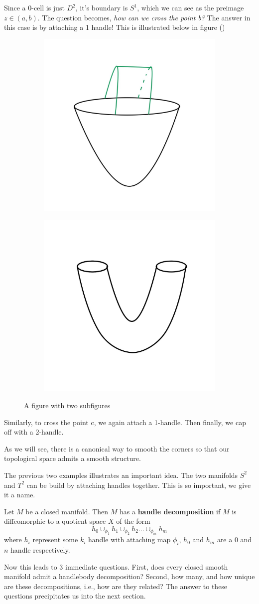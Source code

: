 \begin{example}
Since a 0-cell is just $D^{2}$, it's boundary is $S^{1}$, which we can see as the preimage $z\in (a,b)$. The question becomes, \textit{how can we cross the point b?} The answer in this case is by attaching a 1 handle! This is illustrated below in figure ()
\begin{figure}
\centering
\begin{subfigure}{.1\textwidth}
  \centering
  \includegraphics[width=.3\linewidth]{Images_Lect1/1handle.jpeg}
\end{subfigure}%
\begin{subfigure}{.1\textwidth}
  \centering
  \includegraphics[width=.3\linewidth]{Images_Lect1/1handle1.jpeg}
\end{subfigure}
\caption{A figure with two subfigures}
\label{fig:test}
\end{figure}

Similarly, to cross the point c, we again attach a 1-handle. Then finally, we cap off with a 2-handle.
\end{example}
\begin{remark}
As we will see, there is a canonical way to smooth the corners so that our topological space admits a smooth structure.
\end{remark}

The previous two examples illustrates an important idea. The two manifolds $S^{2}$ and $T^{2}$ can be build by attaching handles together. This is so important, we give it a name.
\begin{definition}
Let $M$ be a closed manifold. Then $M$ has a \textbf{handle decomposition} if $M$ is diffeomorphic to a quotient space $X$ of the form
\[
h_{0}\cup_{\phi_{1}}h_{1}\cup_{\phi_{2}}h_{2}...\cup_{\phi_{m}}h_{m}
\]
where $h_{i}$ represent some $k_{i}$ handle with attaching map $\phi_{i}$, $h_{0}$ and $h_{m}$ are a 0 and $n$ handle respectively.
\end{definition}
Now this leads to 3 immediate questions. First, does every closed smooth manifold admit a handlebody decomposition? Second, how many, and how unique are these decompositions, i.e., how are they related? The answer to these questions precipitates us into the next section.

